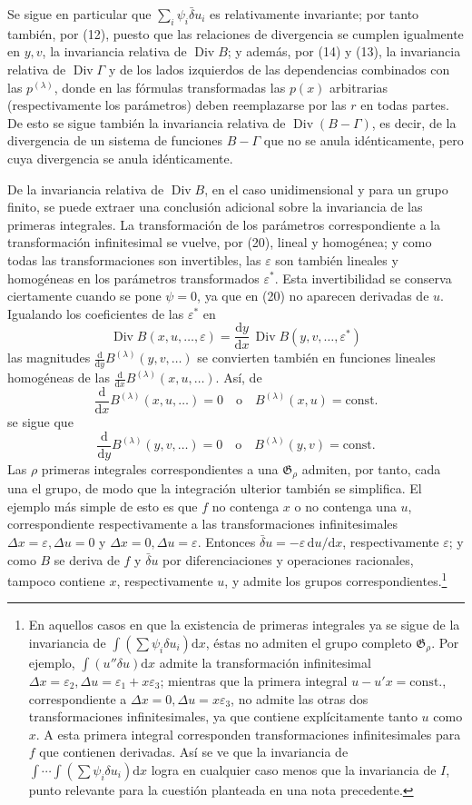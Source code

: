 \documentclass[11pt]{article}
\newcommand{\D}{\Delta}
\newcommand{\eps}{\varepsilon}
\providecommand{\dd}{\mathrm d}
\providecommand{\Div}{\operatorname{Div}}
\providecommand{\G}{\mathfrak G}
\providecommand{\bd}{\bar{\delta}}
\begin{document}
Se sigue en particular que \(\sum_i\psi_i\bd u_i\) es relativamente invariante; por tanto también, por (12), puesto que las relaciones de divergencia se cumplen igualmente en \(y,v\), la invariancia relativa de \(\Div B\); y además, por (14) y (13), la invariancia relativa de \(\Div\Gamma\) y de los lados izquierdos de las dependencias combinados con las \(p^{(\lambda)}\), donde en las fórmulas transformadas las \(p(x)\) arbitrarias (respectivamente los parámetros) deben reemplazarse por las \(r\) en todas partes. De esto se sigue también la invariancia relativa de \(\Div(B-\Gamma)\), es decir, de la divergencia de un sistema de funciones \(B-\Gamma\) que no se anula idénticamente, pero cuya divergencia se anula idénticamente.

De la invariancia relativa de \(\Div B\), en el caso unidimensional y para un grupo finito, se puede extraer una conclusión adicional sobre la invariancia de las primeras integrales. La transformación de los parámetros correspondiente a la transformación infinitesimal se vuelve, por (20), lineal y homogénea; y como todas las transformaciones son invertibles, las \(\eps\) son también lineales y homogéneas en los parámetros transformados \(\eps^*\). Esta invertibilidad se conserva ciertamente cuando se pone \(\psi=0\), ya que en (20) no aparecen derivadas de \(u\). Igualando los coeficientes de las \(\eps^*\) en
\[
\Div B(x,u,\ldots,\eps)=\frac{\dd y}{\dd x}\,\Div B(y,v,\ldots,\eps^*)
\]
las magnitudes \(\frac{\dd}{\dd y}B^{(\lambda)}(y,v,\ldots)\) se convierten también en funciones lineales homogéneas de las \(\frac{\dd}{\dd x}B^{(\lambda)}(x,u,\ldots)\). Así, de
\[
\frac{\dd}{\dd x}B^{(\lambda)}(x,u,\ldots)=0
\quad\text{o}\quad B^{(\lambda)}(x,u)=\mathrm{const.}
\]
se sigue que
\[
\frac{\dd}{\dd y}B^{(\lambda)}(y,v,\ldots)=0
\quad\text{o}\quad B^{(\lambda)}(y,v)=\mathrm{const.}
\]
Las \(\rho\) primeras integrales correspondientes a una \(\G_\rho\) admiten, por tanto, cada una el grupo, de modo que la integración ulterior también se simplifica. El ejemplo más simple de esto es que \(f\) no contenga \(x\) o no contenga una \(u\), correspondiente respectivamente a las transformaciones infinitesimales \(\D x=\eps,\D u=0\) y \(\D x=0,\D u=\eps\). Entonces \(\bd u=-\eps\,\dd u/\dd x\), respectivamente \(\eps\); y como \(B\) se deriva de \(f\) y \(\bd u\) por diferenciaciones y operaciones racionales, tampoco contiene \(x\), respectivamente \(u\), y admite los grupos correspondientes.\footnote{En aquellos casos en que la existencia de primeras integrales ya se sigue de la invariancia de \(\int(\sum\psi_i\delta u_i)\dd x\), éstas no admiten el grupo completo \(\G_\rho\). Por ejemplo, \(\int(u''\delta u)\dd x\) admite la transformación infinitesimal \(\D x=\eps_2,\D u=\eps_1+x\eps_3\); mientras que la primera integral \(u-u'x=\mathrm{const.}\), correspondiente a \(\D x=0,\D u=x\eps_3\), no admite las otras dos transformaciones infinitesimales, ya que contiene explícitamente tanto \(u\) como \(x\). A esta primera integral corresponden transformaciones infinitesimales para \(f\) que contienen derivadas. Así se ve que la invariancia de \(\int\!\cdots\!\int(\sum\psi_i\delta u_i)\dd x\) logra en cualquier caso menos que la invariancia de \(I\), punto relevante para la cuestión planteada en una nota precedente.}
\end{document}

